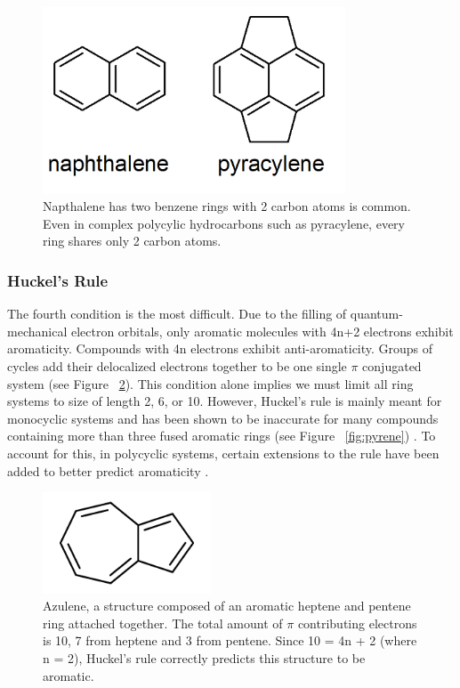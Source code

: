 \documentclass[12pt]{article}
\begin{document}
\begin{figure}[ht!]
\centering
\includegraphics[width=90mm]{polycyclic.png}
\caption{Napthalene has two benzene rings with 2 carbon atoms is common. Even in complex polycylic hydrocarbons such as pyracylene, every ring shares only 2 carbon atoms.}
\label{fig:polycyclic}
\end{figure}

\subsubsection{Huckel's Rule}

The fourth condition is the most difficult. Due to the filling of quantum-mechanical electron orbitals, only aromatic molecules with 4n+2 electrons exhibit aromaticity. Compounds with 4n electrons exhibit anti-aromaticity. Groups of cycles add their delocalized electrons together to be one single $\pi$ conjugated system (see Figure ~\ref{fig:azulene}). This condition alone implies we must limit all ring systems to size of length 2, 6, or 10. However, Huckel's rule is mainly meant for monocyclic systems and has been shown to be inaccurate for many compounds containing more than three fused aromatic rings (see Figure ~\ref{fig:pyrene}) \cite{HuckelBad}. To account for this, in polycyclic systems, certain extensions to the rule have been added to better predict aromaticity \cite{HuckelExtension}.

\begin{figure}[ht!]
\centering
\includegraphics[width=50mm]{azulene.png}
\caption{Azulene, a structure composed of an aromatic heptene and pentene ring attached together. The total amount of $\pi$ contributing electrons is 10, 7 from heptene and 3 from pentene. Since 10 = 4n + 2 (where n = 2), Huckel's rule correctly predicts this structure to be aromatic.}
\label{fig:azulene}
\end{figure}
\end{document}
